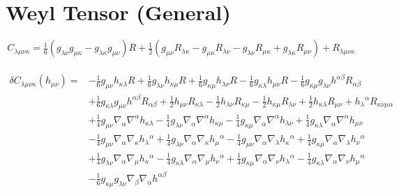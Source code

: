 \documentclass[10pt,letterpaper]{article}
\begin{document}
\section*{Weyl Tensor (General)}
\begin{equation}
C_{\lambda\mu\nu\kappa} = \tfrac{1}{6} (g_{\lambda \nu} g_{\mu \kappa} -  g_{\lambda \kappa} g_{\mu \nu}) R + \tfrac{1}{2} (g_{\mu \nu} R_{\lambda \kappa} -  g_{\mu \kappa} R_{\lambda \nu} -  g_{\lambda \nu} R_{\mu \kappa} + g_{\lambda \kappa} R_{\mu \nu}) + R_{\lambda \mu \nu \kappa}
\end{equation}
\\
\begin{align}
\delta C_{\lambda\mu\nu\kappa}(h_{\mu\nu})={}&- \tfrac{1}{6} g_{\mu \nu} h_{\kappa \lambda} R
 + \tfrac{1}{6} g_{\lambda \nu} h_{\kappa \mu} R
 + \tfrac{1}{6} g_{\kappa \mu} h_{\lambda \nu} R
 -  \tfrac{1}{6} g_{\kappa \lambda} h_{\mu \nu} R
 -  \tfrac{1}{6} g_{\kappa \mu} g_{\lambda \nu} h^{\alpha \beta} R_{\alpha \beta}\nonumber\\
& + \tfrac{1}{6} g_{\kappa \lambda} g_{\mu \nu} h^{\alpha \beta} R_{\alpha \beta}
 + \tfrac{1}{2} h_{\mu \nu} R_{\kappa \lambda}
 -  \tfrac{1}{2} h_{\lambda \nu} R_{\kappa \mu}
 -  \tfrac{1}{2} h_{\kappa \mu} R_{\lambda \nu}
 + \tfrac{1}{2} h_{\kappa \lambda} R_{\mu \nu}
 + h_{\lambda}{}^{\alpha} R_{\kappa \nu \mu \alpha}\nonumber \\
&+\tfrac{1}{4} g_{\mu \nu} \nabla_{\alpha}\nabla^{\alpha}h_{\kappa \lambda}
 -  \tfrac{1}{4} g_{\lambda \nu} \nabla_{\alpha}\nabla^{\alpha}h_{\kappa \mu}
 -  \tfrac{1}{4} g_{\kappa \mu} \nabla_{\alpha}\nabla^{\alpha}h_{\lambda \nu}
 + \tfrac{1}{4} g_{\kappa \lambda} \nabla_{\alpha}\nabla^{\alpha}h_{\mu \nu}\nonumber\\
& -  \tfrac{1}{4} g_{\mu \nu} \nabla_{\alpha}\nabla_{\kappa}h_{\lambda}{}^{\alpha}
 + \tfrac{1}{4} g_{\lambda \nu} \nabla_{\alpha}\nabla_{\kappa}h_{\mu}{}^{\alpha}
 -  \tfrac{1}{4} g_{\mu \nu} \nabla_{\alpha}\nabla_{\lambda}h_{\kappa}{}^{\alpha}
 + \tfrac{1}{4} g_{\kappa \mu} \nabla_{\alpha}\nabla_{\lambda}h_{\nu}{}^{\alpha}\nonumber\\
& + \tfrac{1}{4} g_{\lambda \nu} \nabla_{\alpha}\nabla_{\mu}h_{\kappa}{}^{\alpha}
 -  \tfrac{1}{4} g_{\kappa \lambda} \nabla_{\alpha}\nabla_{\mu}h_{\nu}{}^{\alpha}
 + \tfrac{1}{4} g_{\kappa \mu} \nabla_{\alpha}\nabla_{\nu}h_{\lambda}{}^{\alpha}
 -  \tfrac{1}{4} g_{\kappa \lambda} \nabla_{\alpha}\nabla_{\nu}h_{\mu}{}^{\alpha}\nonumber\\
& -  \tfrac{1}{6} g_{\kappa \mu} g_{\lambda \nu} \nabla_{\beta}\nabla_{\alpha}h^{\alpha \beta}

\end{align}
\end{document}
